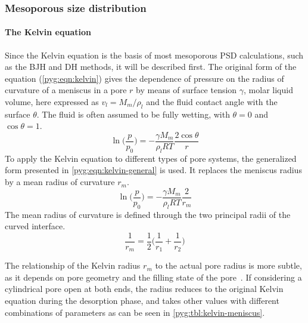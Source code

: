 \subsubsection{Mesoporous size distribution}

\paragraph{The Kelvin equation}

Since the Kelvin equation is the basis of most mesoporous PSD
calculations, such as the \gls{BJH} and \gls{DH} methods, it will be described
first. The original form of the equation (\autoref{pyg:eqn:kelvin})
gives the dependence of pressure on the radius of curvature of a
meniscus in a pore \(r\) by means of surface tension \( \gamma \),
molar liquid volume, here expressed as \(v_l=M_m/\rho_l\) and the
fluid contact angle with the surface
\( \theta \). The fluid is often assumed to be fully wetting, with
\(\theta=0\) and \(\cos\theta=1\).
%
\begin{equation}\label{pyg:eqn:kelvin}
	\ln\Big(\frac{p}{p_0}\Big) = -\frac{\gamma M_m}{\rho_l RT}\frac{2 \cos\theta}{r}
\end{equation}
%
To apply the Kelvin equation to different types of pore systems, the
generalized form presented in \autoref{pyg:eqn:kelvin-general}
is used. It replaces the meniscus radius by a mean radius of curvature
\(r_m\).
%
\begin{equation}\label{pyg:eqn:kelvin-general}
	\ln\Big(\frac{p}{p_0}\Big) = -\frac{\gamma M_m}{\rho_l RT}\frac{2}{r_m}
\end{equation}
%
The mean radius of curvature is defined through the two principal
radii of the curved interface.
%
\begin{equation}\label{pyg:eqn:kelvin-mradius}
	\frac{1}{r_m} = \frac{1}{2}\Big(\frac{1}{r_1}+\frac{1}{r_2}\Big)
\end{equation}

The relationship of the Kelvin radius \(r_m\) to the actual pore
radius is more subtle, as it depends on pore geometry and the
filling state of the pore~\cite{doAdsorptionAnalysisEquilibria1998}.
If considering a cylindrical pore open at both ends, the radius reduces
to the original Kelvin equation during the desorption phase, and takes
other values with different combinations of parameters
as can be seen in \autoref{pyg:tbl:kelvin-meniscus}.

